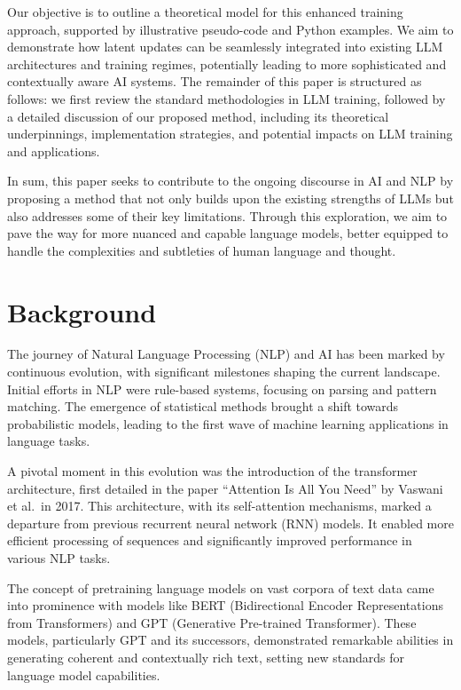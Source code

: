 \documentclass[
]{article}
\begin{document}
Our objective is to outline a theoretical model for this enhanced
training approach, supported by illustrative pseudo-code and Python
examples. We aim to demonstrate how latent updates can be seamlessly
integrated into existing LLM architectures and training regimes,
potentially leading to more sophisticated and contextually aware AI
systems. The remainder of this paper is structured as follows: we first
review the standard methodologies in LLM training, followed by a
detailed discussion of our proposed method, including its theoretical
underpinnings, implementation strategies, and potential impacts on LLM
training and applications.

In sum, this paper seeks to contribute to the ongoing discourse in AI
and NLP by proposing a method that not only builds upon the existing
strengths of LLMs but also addresses some of their key limitations.
Through this exploration, we aim to pave the way for more nuanced and
capable language models, better equipped to handle the complexities and
subtleties of human language and thought.

\hypertarget{background}{%
\section{Background}\label{background}}

The journey of Natural Language Processing (NLP) and AI has been marked
by continuous evolution, with significant milestones shaping the current
landscape. Initial efforts in NLP were rule-based systems, focusing on
parsing and pattern matching. The emergence of statistical methods
brought a shift towards probabilistic models, leading to the first wave
of machine learning applications in language tasks.

A pivotal moment in this evolution was the introduction of the
transformer architecture, first detailed in the paper ``Attention Is All
You Need'' by Vaswani et al.~in 2017. This architecture, with its
self-attention mechanisms, marked a departure from previous recurrent
neural network (RNN) models. It enabled more efficient processing of
sequences and significantly improved performance in various NLP tasks.

The concept of pretraining language models on vast corpora of text data
came into prominence with models like BERT (Bidirectional Encoder
Representations from Transformers) and GPT (Generative Pre-trained
Transformer). These models, particularly GPT and its successors,
demonstrated remarkable abilities in generating coherent and
contextually rich text, setting new standards for language model
capabilities.
\end{document}
